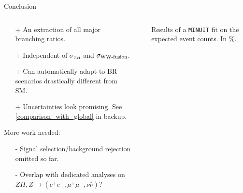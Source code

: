 
\begin{frame}{Conclusion}
  \begin{columns}[c, onlytextwidth]
\begin{column}{0.5\textwidth}
  \begin{itemize}
    \item[+] An extraction of all major branching ratios.
    \item[+] Independent of $\sigma_{ZH}$ and $\sigma_{\textnormal{WW-fusion}}$.
    \item[+] Can automatically adapt to BR scenarios
        drastically different from SM.
    \item[+] Uncertainties look promising.
        See {\color{llblue}\ref{comparison_with_global}} in backup.
  \end{itemize}
  More work needed:
  \begin{itemize}
    \item[-] Signal selection/background rejection omitted so far.
    \item[-] Overlap with dedicated analyses on $ZH, Z\to (e^+e^-, \mu^+\mu^-, \nu\bar{\nu})$?
  \end{itemize}
  \end{column}
  \begin{column}{0.05\textwidth}
  \end{column}
  \begin{column}{0.45\textwidth}
    \begin{table}
      \caption{Results of a \texttt{MINUIT} fit on the \hspace{\textwidth}
          expected event counts. In \%.}
      \end{table}
  \end{column}
  \end{columns}
\end{frame}